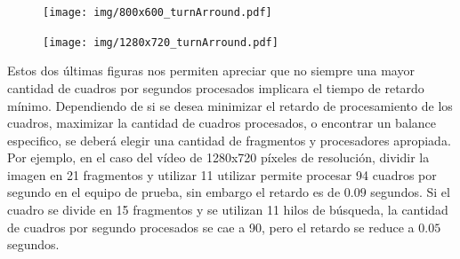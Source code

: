 \begin{figure}[!h]

	\texttt{[image: img/800x600\_turnArround.pdf]}
	\caption{}
	\label{800turnArround}

\end{figure}


\begin{figure}[!h]

	\texttt{[image: img/1280x720\_turnArround.pdf]}
	\caption{}
	\label{1280turnArround}

\end{figure}

Estos dos últimas figuras nos permiten apreciar que no siempre una mayor
cantidad de cuadros por segundos procesados implicara el tiempo de retardo
mínimo. Dependiendo de si se desea minimizar el retardo de procesamiento de los
cuadros, maximizar la cantidad de cuadros procesados, o encontrar un balance
especifico, se deberá elegir una cantidad de fragmentos y procesadores
apropiada. Por ejemplo, en el caso del vídeo de 1280x720 píxeles de resolución,
dividir la imagen en 21 fragmentos y utilizar 11 utilizar permite procesar 94
cuadros por segundo en el equipo de prueba, sin embargo el retardo es de $0.09$
segundos. Si el cuadro se divide en 15 fragmentos y se utilizan 11 hilos de
búsqueda, la cantidad de cuadros por segundo procesados se cae a 90, pero el
retardo se reduce a $0.05$ segundos.
